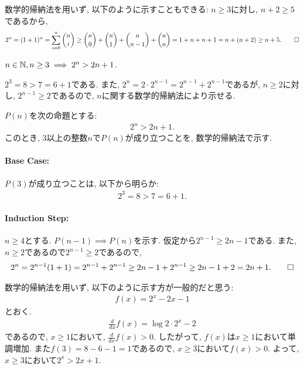 \begin{rem}
  数学的帰納法を用いず, 以下のように示すこともできる:
  $n\geq 3$に対し, $n+2\geq 5$であるから,
  \begin{align*}
    2^n=(1+1)^n=\sum_{i=0}^n \binom{n}{i}\geq \binom{n}{0}+\binom{n}{1}+\binom{n}{n-1}+\binom{n}{n}=1+n+n+1=n+(n+2)\geq n+5
    .\qedhere
  \end{align*}
\end{rem}

\begin{prop}
  \label{p:20230813}
  $n\in\mathbb{N}, n\geq 3\implies 2^n> 2n+1$.
\end{prop}
\begin{proof**}
  $2^3=8>7=6+1$である.
  また,
  $2^n=2\cdot 2^{n-1}=2^{n-1}+2^{n-1}$であるが,
  $n\geq 2$に対し,
  $2^{n-1} \geq 2$であるので,
  $n$に関する数学的帰納法により示せる.
\end{proof**}
\begin{proof*}
  $P(n)$を次の命題とする:
  \begin{align*}
    2^n> 2n+1
    .
  \end{align*}
  このとき,
  $3$以上の整数$n$で$P(n)$が成り立つことを,
  数学的帰納法で示す.

  \paragraph{Base Case:}
  $P(3)$が成り立つことは, 以下から明らか:
  \begin{align*}
    2^3=8>7=6+1.
  \end{align*}
  \paragraph{Induction Step:}
  $n\geq 4$とする.
  $P(n-1)\implies P(n)$を示す.
  仮定から$2^{n-1}\geq 2n-1$である.
  また, $n\geq 2$であるので$2^{n-1}\geq 2$であるので,
  \begin{align*}
    2^n=2^{n-1}(1+1)=2^{n-1}+2^{n-1}\geq 2n-1+2^{n-1}\geq 2n-1+2=2n+1
    .\qedhere
  \end{align*}
\end{proof*}

\begin{rem}
  数学的帰納法を用いず, 以下のように示す方が一般的だと思う:
  \begin{align*}
    f(x)=2^x-2x-1
  \end{align*}
  とおく.
  \begin{align*}
    \frac{d}{dx}f(x)=\log 2 \cdot 2^x-2
  \end{align*}
  であるので, $x\geq 1$において, $\frac{d}{dx}f(x)> 0$.
  したがって, $f(x)$は$x\geq 1$において単調増加.
  また$f(3)=8-6-1=1$であるので,
  $x\geq 3$において$f(x) > 0$.
  よって, $x\geq 3$において$2^x>2x+1$.
\end{rem}

